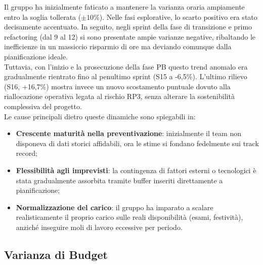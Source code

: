 \documentclass[a4paper,11pt,oneside]{scrartcl}
\begin{document}
Il gruppo ha inizialmente faticato a mantenere la varianza oraria ampiamente entro la soglia tollerata ($\pm 10\%$). Nelle fasi esplorative, lo scarto positivo era stato decisamente accentuato. In seguito, negli sprint della fase di transizione e primo refactoring (dal 9 al 12) si sono presentate ampie varianze negative, ribaltando le inefficienze in un massiccio risparmio di ore ma deviando comunque dalla pianificazione ideale.\\
Tuttavia, con l'inizio e la prosecuzione della fase PB questo trend anomalo era gradualmente rientrato fino al penultimo sprint (S15 a -6,5\%). L'ultimo rilievo (S16, +16,7\%) mostra invece un nuovo scostamento puntuale dovuto alla riallocazione operativa legata al rischio RP3, senza alterare la sostenibilità complessiva del progetto.\\
Le cause principali dietro queste dinamiche sono spiegabili in:
\begin{itemize}
    \item \textbf{Crescente maturità nella preventivazione}: inizialmente il team non disponeva di dati storici affidabili, ora le stime si fondano fedelmente sui track record;
    \item \textbf{Flessibilità agli imprevisti}: la contingenza di fattori esterni o tecnologici è stata gradualmente assorbita tramite buffer inseriti direttamente a pianificazione;
    \item \textbf{Normalizzazione del carico}: il gruppo ha imparato a scalare realisticamente il proprio carico sulle reali disponibilità (esami, festività), anziché inseguire moli di lavoro eccessive per periodo.
\end{itemize}

\subsection{Varianza di Budget}
\end{document}
